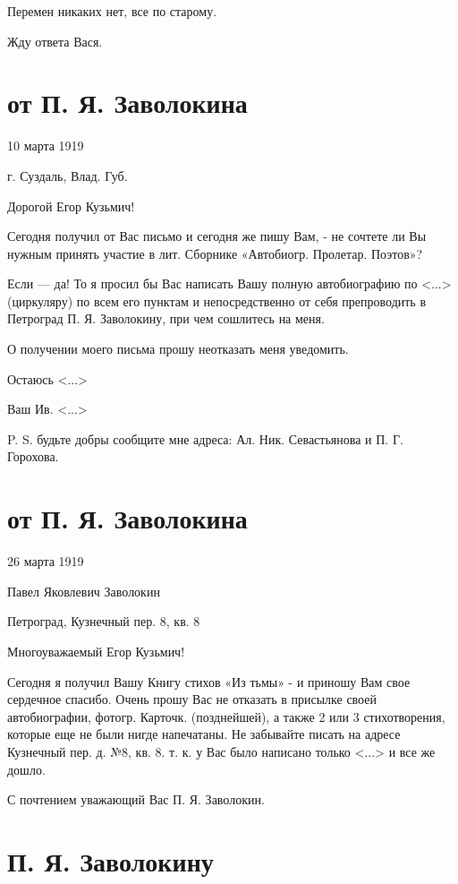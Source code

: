 \documentclass[]{memoir}
\begin{document}
Перемен никаких нет, все по старому.

Жду ответа Вася.



\section{от П. Я. Заволокина}
10 марта 1919

г. Суздаль, Влад. Губ.

Дорогой Егор Кузьмич!

Сегодня получил от Вас письмо и сегодня же пишу Вам, - не сочтете ли Вы нужным принять участие в лит. Сборнике «Автобиогр. Пролетар. Поэтов»?

Если — да! То я просил бы Вас написать Вашу полную автобиографию по <...> (циркуляру) по всем его пунктам и непосредственно от себя препроводить в Петроград П. Я. Заволокину, при чем сошлитесь на меня.

О получении моего письма прошу неотказать меня уведомить.

Остаюсь <...>

Ваш Ив. <...>

P. S. будьте добры сообщите мне адреса: Ал. Ник. Севастьянова и П. Г. Горохова.

\section{от П. Я. Заволокина}
26 марта 1919

Павел Яковлевич Заволокин

Петроград, Кузнечный пер. 8, кв. 8

Многоуважаемый Егор Кузьмич!

Сегодня я получил Вашу Книгу стихов «Из тьмы» - и приношу Вам свое сердечное спасибо. Очень прошу Вас не отказать в присылке своей автобиографии, фотогр. Карточк. (позднейшей), а также 2 или 3 стихотворения, которые еще не были нигде напечатаны. Не забывайте писать на адресе Кузнечный пер. д. №8, кв. 8. т. к. у Вас было написано только <...> и все же дошло.

С почтением уважающий Вас П. Я. Заволокин. 

\section{П. Я. Заволокину}
\end{document}
